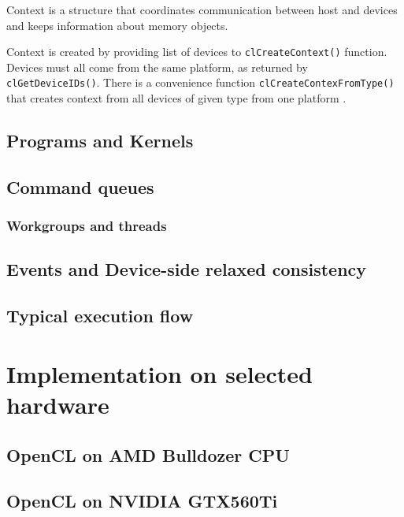 Context is a structure that coordinates communication between host and devices
and keeps information about memory objects. 

Context is created by providing list of devices to \texttt{clCreateContext()}
function. Devices must all come from the same platform, as returned by
\texttt{clGetDeviceIDs()}. There is a convenience function \texttt{clCreateContexFromType()}
that creates context from all devices of given type from one platform \parencite{openclspec}.

\subsection{Programs and Kernels}

\subsection{Command queues}

\subsubsection{Workgroups and threads}
\label{subsub:clworkgroups}

\subsection{Events and Device-side relaxed consistency}
\label{sub:clevents}

\subsection{Typical execution flow}

\section{Implementation on selected hardware}
\label{sec:climpl}
\subsection{OpenCL on AMD Bulldozer CPU}

\subsection{OpenCL on NVIDIA GTX560Ti}
